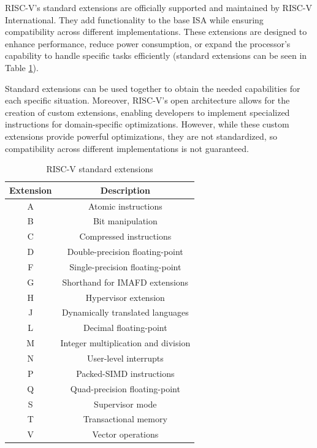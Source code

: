 RISC-V’s standard extensions are officially supported and maintained by RISC-V International.
They add functionality to the base ISA while ensuring compatibility across
different implementations. These extensions are designed to enhance performance,
reduce power consumption, or expand the processor's capability to handle specific
tasks efficiently (standard extensions can be seen in Table \ref{tab:extensions}).

Standard extensions can be used together to obtain the needed capabilities for each
specific situation. Moreover, RISC-V’s open architecture allows for the creation
of custom extensions, enabling developers to implement specialized instructions
for domain-specific optimizations. However, while these custom extensions
provide powerful optimizations, they are not standardized, so compatibility
across different implementations is not guaranteed.

\begin{table}
  \centering
  \begin{tabular}{|c|c|}
    \hline
    \textbf{Extension} & \textbf{Description}                \\
    \hline
    A                  & Atomic instructions                 \\
    \hline
    B                  & Bit manipulation                    \\
    \hline
    C                  & Compressed instructions             \\
    \hline
    D                  & Double-precision floating-point     \\
    \hline
    F                  & Single-precision floating-point     \\
    \hline
    G                  & Shorthand for IMAFD extensions      \\
    \hline
    H                  & Hypervisor extension                \\
    \hline
    J                  & Dynamically translated languages    \\
    \hline
    L                  & Decimal floating-point              \\
    \hline
    M                  & Integer multiplication and division \\
    \hline
    N                  & User-level interrupts               \\
    \hline
    P                  & Packed-SIMD instructions            \\
    \hline
    Q                  & Quad-precision floating-point       \\
    \hline
    S                  & Supervisor mode                     \\
    \hline
    T                  & Transactional memory                \\
    \hline
    V                  & Vector operations                   \\
    \hline
  \end{tabular}
  \caption{RISC-V standard extensions}
  \label{tab:extensions}
\end{table}


